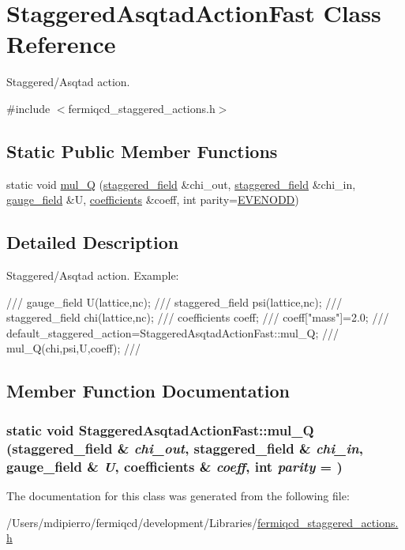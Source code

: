 \hypertarget{class_staggered_asqtad_action_fast}{
\section{StaggeredAsqtadActionFast Class Reference}
\label{class_staggered_asqtad_action_fast}
}


Staggered/Asqtad action.  


{\ttfamily \#include $<$fermiqcd\_\-staggered\_\-actions.h$>$}\subsection*{Static Public Member Functions}
\begin{DoxyCompactItemize}
\item 
static void \hyperlink{class_staggered_asqtad_action_fast_a0935fc01782fc453823fbabfe24aa2be}{mul\_\-Q} (\hyperlink{classstaggered__field}{staggered\_\-field} \&chi\_\-out, \hyperlink{classstaggered__field}{staggered\_\-field} \&chi\_\-in, \hyperlink{classgauge__field}{gauge\_\-field} \&U, \hyperlink{classcoefficients}{coefficients} \&coeff, int parity=\hyperlink{mdp__global__vars_8h_a4c9de81f2de5a74b588107b6c0afb9ee}{EVENODD})
\end{DoxyCompactItemize}


\subsection{Detailed Description}
Staggered/Asqtad action. Example: \begin{DoxyVerb}
/// gauge_field U(lattice,nc);
/// staggered_field psi(lattice,nc);
/// staggered_field chi(lattice,nc);
/// coefficients coeff;
/// coeff["mass"]=2.0;
/// default_staggered_action=StaggeredAsqtadActionFast::mul_Q;
/// mul_Q(chi,psi,U,coeff);
/// \end{DoxyVerb}
 

\subsection{Member Function Documentation}
\hypertarget{class_staggered_asqtad_action_fast_a0935fc01782fc453823fbabfe24aa2be}{
\subsubsection[{mul\_\-Q}]{\setlength{\rightskip}{0pt plus 5cm}static void StaggeredAsqtadActionFast::mul\_\-Q ({\bf staggered\_\-field} \& {\em chi\_\-out}, \/  {\bf staggered\_\-field} \& {\em chi\_\-in}, \/  {\bf gauge\_\-field} \& {\em U}, \/  {\bf coefficients} \& {\em coeff}, \/  int {\em parity} = {})}}
\label{class_staggered_asqtad_action_fast_a0935fc01782fc453823fbabfe24aa2be}


The documentation for this class was generated from the following file:\begin{DoxyCompactItemize}
\item 
/Users/mdipierro/fermiqcd/development/Libraries/\hyperlink{fermiqcd__staggered__actions_8h}{fermiqcd\_\-staggered\_\-actions.h}\end{DoxyCompactItemize}
